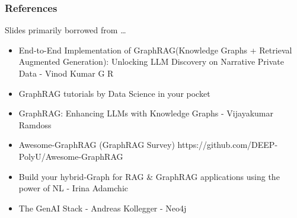 \begin{frame}[fragile]\frametitle{References}
Slides primarily borrowed from \ldots

\begin{itemize}
\item End-to-End Implementation of GraphRAG(Knowledge Graphs + Retrieval Augmented Generation): Unlocking LLM Discovery on Narrative Private Data - Vinod Kumar G R
\item GraphRAG tutorials by Data Science in your pocket
\item GraphRAG: Enhancing LLMs with Knowledge Graphs - Vijayakumar Ramdoss
\item Awesome-GraphRAG (GraphRAG Survey) https://github.com/DEEP-PolyU/Awesome-GraphRAG
\item Build your hybrid-Graph for RAG \& GraphRAG applications using the power of NL - Irina Adamchic
\item The GenAI Stack - Andreas Kollegger - Neo4j
\end{itemize}

\end{frame}
